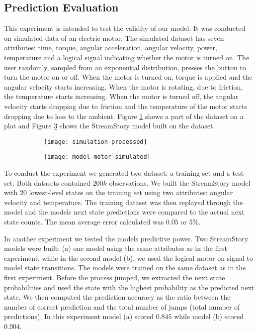 \subsection{Prediction Evaluation}

This experiment is intended to test the validity of our model. It was conducted on simulated data of 
an electric motor. The simulated dataset has seven attributes: time, torque, angular acceleration,
angular velocity, power, temperature and a logical signal indicating whether the motor is turned on.
The user randomly, sampled from an exponential distribution, presses the button to turn the motor on or off.
When the motor is turned on, torque is applied and the angular velocity starts increasing. When the motor
is rotating, due to friction, the temperature starts increasing. When the motor is turned off, the angular velocity
starts dropping due to friction and the temperature of the motor starts dropping due to loss to the ambient.
Figure \ref{fig:simulation} shows a part of the dataset on a plot and Figure \ref{fig:example-motor} shows
the StreamStory model built on the dataset.

\begin{figure}[h!]
	\centering
	\begin{subfigure}{.48\columnwidth}
	  	\centering
	  	\texttt{[image: simulation-processed]}
  		\caption{}
  		\label{fig:simulation}
	\end{subfigure}
	\begin{subfigure}{.48\columnwidth}
	  	\centering
	  	\texttt{[image: model-motor-simulated]}
	  	\caption{}
	  	\label{fig:example-motor}
	\end{subfigure}
\end{figure}

To conduct the experiment we generated two dataset: a training set and a test set. Both datasets
contained $200k$ observations. We built the StreamStory model with 20 lowest-level states on the training set using two attributes:
angular velocity and temperature. The training dataset was then replayed through the model and the
models next state predictions were compared to the actual next state counts. The mean average 
error calculated was $0.05$ or 5\%.

In another experiment we tested the models predictive power. Two StreamStory models were built: (a) one 
model using the same attributes as in the first experiment, while in the second model (b), we used
the logical motor on signal to model state transitions. The models were trained on the same dataset
as in the first experiment. Before the process jumped, we extracted the next state probabilities
and used the state with the highest probability as the predicted next state. We then computed
the prediction accuracy as the ratio between the number of correct prediction and the total number
of jumps (total number of predictions). In this experiment model (a) scored $0.845$ while model
(b) scored $0.904$.


